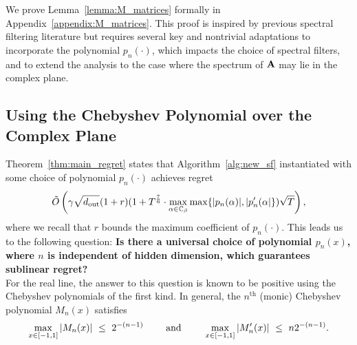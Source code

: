 We prove Lemma~\ref{lemma:M_matrices} formally in Appendix~\ref{appendix:M_matrices}. This proof is inspired by previous spectral filtering literature but requires several key and nontrivial adaptations to incorporate the polynomial $p_n(\cdot)$, which impacts the choice of spectral filters, and to extend the analysis to the case where the spectrum of $\mathbf{A}$ may lie in the complex plane. 


\subsection{Using the Chebyshev Polynomial over the Complex Plane}

Theorem~\ref{thm:main_regret} states that Algorithm~\ref{alg:new_sf} instantiated with some choice of polynomial $p_n(\cdot)$ achieves regret
\begin{equation*}
    \tilde{O} \left(\gamma \sqrt{d_{\textrm{out}}} (1 + r) (1 + T^{ \frac{7}{6}} \cdot \max_{\alpha \in \mathbb{C}_{\beta}} \max \{|p_n(\alpha)|, |p_n'(\alpha| \}) \sqrt{T}\right),
\end{equation*}
where we recall that $r$ bounds the maximum coefficient of $p_n(\cdot)$.  This leads us to the following question: \textbf{Is there a universal choice of polynomial $p_n(x)$, where $n$ is independent of hidden dimension, which guarantees sublinear regret? } \\ %

For the real line, the answer to this question is known to be positive using the Chebyshev polynomials of the first kind. In general, the $n^{\textrm{th}}$ (monic) Chebyshev polynomial $M_n(x)$ satisfies
\begin{align*}
    \max_{x \in [-1,1]} |M_n(x)| ~\le~ 2^{-(n-1)} \qquad \textrm{ and } \qquad  \max_{x \in [-1,1]} |M_n'(x)| ~\le~ n 2^{-(n-1)}.
\end{align*}

